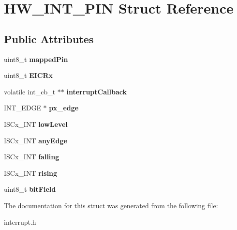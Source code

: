\hypertarget{structHW__INT__PIN}{}\section{H\+W\+\_\+\+I\+N\+T\+\_\+\+P\+IN Struct Reference}
\label{structHW__INT__PIN}
\subsection*{Public Attributes}
\begin{DoxyCompactItemize}
\item 
\mbox{\label{structHW__INT__PIN_a69d9ddba3cc41c69082271c88e3b9620}} 
uint8\+\_\+t {\bfseries mapped\+Pin}
\item 
\mbox{\label{structHW__INT__PIN_a9f324c3632281053376de195c8a4401a}} 
uint8\+\_\+t {\bfseries E\+I\+C\+Rx}
\item 
\mbox{\label{structHW__INT__PIN_a553e9442be5f738b892a8d065b274313}} 
volatile int\+\_\+cb\+\_\+t $\ast$$\ast$ {\bfseries interrupt\+Callback}
\item 
\mbox{\label{structHW__INT__PIN_aeca115b23cb1b3a6130444eb6de309b6}} 
I\+N\+T\+\_\+\+E\+D\+GE $\ast$ {\bfseries px\+\_\+edge}
\item 
\mbox{\label{structHW__INT__PIN_ad2a69e2c92f937cfde12c0eaca5d41c2}} 
I\+S\+Cx\+\_\+\+I\+NT {\bfseries low\+Level}
\item 
\mbox{\label{structHW__INT__PIN_a9527056267580f8c3698107c0f5bf9f7}} 
I\+S\+Cx\+\_\+\+I\+NT {\bfseries any\+Edge}
\item 
\mbox{\label{structHW__INT__PIN_a5dce3e9352d00bd55cb9f87de720b2f5}} 
I\+S\+Cx\+\_\+\+I\+NT {\bfseries falling}
\item 
\mbox{\label{structHW__INT__PIN_aa15c9ca17d61e91ec5ff071067b0e027}} 
I\+S\+Cx\+\_\+\+I\+NT {\bfseries rising}
\item 
\mbox{\label{structHW__INT__PIN_a5d1c0c3c1a4b58026c292c8d155ce35b}} 
uint8\+\_\+t {\bfseries bit\+Field}
\end{DoxyCompactItemize}


The documentation for this struct was generated from the following file\+:\begin{DoxyCompactItemize}
\item 
interrupt.\+h\end{DoxyCompactItemize}

